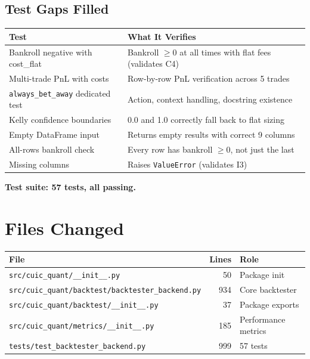 \documentclass[11pt,a4paper]{article}
\begin{document}
\subsection{Test Gaps Filled}

\begin{table}[h]
\centering
\begin{tabular}{@{}p{5cm}p{8cm}@{}}
\toprule
\textbf{Test} & \textbf{What It Verifies} \\
\midrule
Bankroll negative with cost\_flat & Bankroll $\geq 0$ at all times with flat fees (validates C4) \\
Multi-trade PnL with costs & Row-by-row PnL verification across 5 trades \\
\texttt{always\_bet\_away} dedicated test & Action, context handling, docstring existence \\
Kelly confidence boundaries & 0.0 and 1.0 correctly fall back to flat sizing \\
Empty DataFrame input & Returns empty results with correct 9 columns \\
All-rows bankroll check & Every row has bankroll $\geq 0$, not just the last \\
Missing columns & Raises \texttt{ValueError} (validates I3) \\
\bottomrule
\end{tabular}
\end{table}

\begin{center}
\textbf{Test suite: 57 tests, all passing.}
\end{center}

\section{Files Changed}

\begin{table}[h]
\centering
\begin{tabular}{@{}lrl@{}}
\toprule
\textbf{File} & \textbf{Lines} & \textbf{Role} \\
\midrule
\texttt{src/cuic\_quant/\_\_init\_\_.py} & 50 & Package init \\
\texttt{src/cuic\_quant/backtest/backtester\_backend.py} & 934 & Core backtester \\
\texttt{src/cuic\_quant/backtest/\_\_init\_\_.py} & 37 & Package exports \\
\texttt{src/cuic\_quant/metrics/\_\_init\_\_.py} & 185 & Performance metrics \\
\texttt{tests/test\_backtester\_backend.py} & 999 & 57 tests \\
\bottomrule
\end{tabular}
\end{table}
\end{document}
